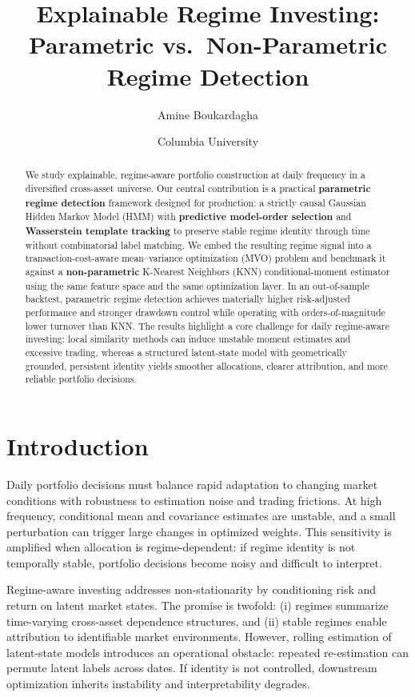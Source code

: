 \documentclass[11pt]{article}
\title{
Explainable Regime Investing: Parametric vs.\ Non-Parametric Regime Detection
}
\author{Amine Boukardagha }
\date{Columbia University}
\begin{document}
\maketitle

\begin{abstract}
We study explainable, regime-aware portfolio construction at daily frequency in a diversified cross-asset universe.
Our central contribution is a practical \textbf{parametric regime detection} framework designed for production:
a strictly causal Gaussian Hidden Markov Model (HMM) with \textbf{predictive model-order selection} and
\textbf{Wasserstein template tracking} to preserve stable regime identity through time without combinatorial label matching.
We embed the resulting regime signal into a transaction-cost-aware mean--variance optimization (MVO) problem and benchmark it against a
\textbf{non-parametric} K-Nearest Neighbors (KNN) conditional-moment estimator using the same feature space and the same optimization layer.
In an out-of-sample backtest, parametric regime detection achieves materially higher risk-adjusted performance and
stronger drawdown control while operating with orders-of-magnitude lower turnover than KNN.
The results highlight a core challenge for daily regime-aware investing:
local similarity methods can induce unstable moment estimates and excessive trading,
whereas a structured latent-state model with geometrically grounded, persistent identity yields smoother allocations,
clearer attribution, and more reliable portfolio decisions.
\end{abstract}

\section{Introduction}

Daily portfolio decisions must balance rapid adaptation to changing market conditions with robustness to estimation noise and trading frictions.
At high frequency, conditional mean and covariance estimates are unstable, and a small perturbation can trigger large changes in optimized weights.
This sensitivity is amplified when allocation is regime-dependent: if regime identity is not temporally stable, portfolio decisions become noisy and difficult to interpret.

Regime-aware investing addresses non-stationarity by conditioning risk and return on latent market states.
The promise is twofold: (i) regimes summarize time-varying cross-asset dependence structures, and (ii) stable regimes enable attribution to identifiable market environments.
However, rolling estimation of latent-state models introduces an operational obstacle: repeated re-estimation can permute latent labels across dates.
If identity is not controlled, downstream optimization inherits instability and interpretability degrades.
\end{document}
